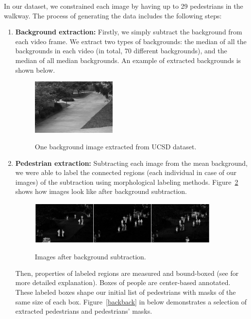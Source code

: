 In our dataset, we constrained each image by having up to 29 pedestrians in the walkway. The process of generating the data includes the following steps:
\begin{enumerate}

\item \textbf{Background extraction:} Firstly, we simply subtract the background from each video frame. We extract two types of backgrounds: the median of all the backgrounds in each video (in total, 70 different backgrounds), and the median of all median backgrounds. An example of extracted backgrounds is shown below.

\begin{figure}[H]
	\centering
	{\includegraphics[width=0.4\textwidth]{images/background}}
	\caption{One background image extracted from UCSD dataset.}
	\label{fig:bgim}
\end{figure}


\item \textbf{Pedestrian extraction:} Subtracting each image from the mean background, we were able to label the connected regions (each individual in case of our images) of the subtraction using morphological labeling methods. Figure~\ref{fig:nobg} shows how images look like after background subtraction. 
\begin{figure}[H]
	\centering
	{\includegraphics[width=0.9\textwidth]{images/nobg}}
	\caption{Images after background subtraction.}
	\label{fig:nobg}
\end{figure}
 
Then, properties of labeled regions are measured and bound-boxed (see \cite{van2014scikit} for more detailed explanation). Boxes of people are center-based annotated. These labeled boxes shape our initial list of pedestrians with masks of the same size of each box. Figure~\ref{backback} in below demonstrates a selection of extracted pedestrians and pedestrians' masks.


\end{enumerate}
